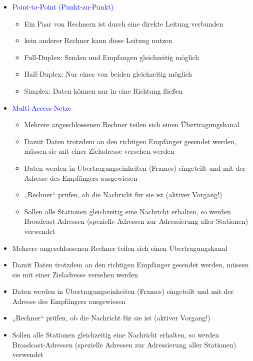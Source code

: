 \begin{itemize}
    \item \textcolor{blue}{Point-to-Point (Punkt-zu-Punkt)}
    \begin{itemize}
        \item Ein Paar von Rechnern ist durch eine direkte Leitung verbunden
        \item kein anderer Rechner kann diese Leitung nutzen
        \item Full-Duplex: Senden und Empfangen gleichzeitig möglich
        \item Half-Duplex: Nur eines von beiden gleichzeitig möglich
        \item Simplex: Daten können nur in eine Richtung fließen
    \end{itemize}
    \item \textcolor{blue}{Multi-Access-Netze}
    \begin{itemize}
        \item Mehrere angeschlossenen Rechner teilen sich einen Übertragungskanal
        \item Damit Daten trotzdem an den richtigen Empfänger gesendet werden, müssen sie mit einer Zieladresse versehen werden
        \item Daten werden in Übertragungseinheiten (Frames) eingeteilt und mit der Adresse des Empfängers ausgewiesen
        \item „Rechner“ prüfen, ob die Nachricht für sie ist (aktiver Vorgang!)
        \item Sollen alle Stationen gleichzeitig eine Nachricht erhalten, so werden Broadcast-Adressen (spezielle Adressen zur Adressierung aller Stationen) verwendet
    \end{itemize}
\end{itemize}

\begin{itemize}
    \item Mehrere angeschlossenen Rechner teilen sich einen Übertragungskanal
    \item Damit Daten trotzdem an den richtigen Empfänger gesendet werden, müssen sie mit einer Zieladresse versehen werden
    \item Daten werden in Übertragungseinheiten (Frames) eingeteilt und mit der Adresse des Empfängers ausgewiesen
    \item „Rechner“ prüfen, ob die Nachricht für sie ist (aktiver Vorgang!)
    \item Sollen alle Stationen gleichzeitig eine Nachricht erhalten, so werden Broadcast-Adressen (spezielle Adressen zur Adressierung aller Stationen) verwendet
\end{itemize}

